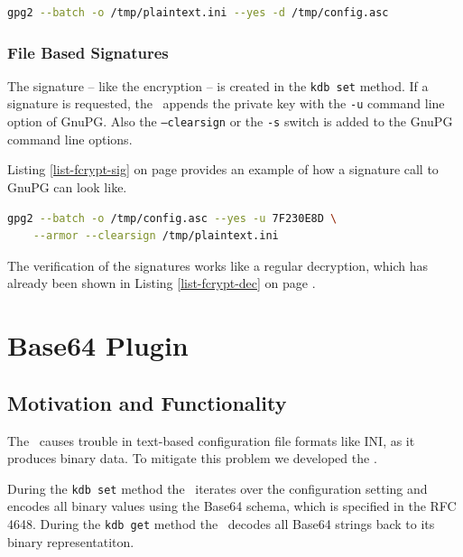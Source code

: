 \begin{lstlisting}[label=list-fcrypt-dec,language=Bash,caption={Fcrypt: decryption command}]
gpg2 --batch -o /tmp/plaintext.ini --yes -d /tmp/config.asc
\end{lstlisting}

\subsubsection{File Based Signatures}

The signature -- like the encryption -- is created in the \texttt{kdb set} method.
If a signature is requested, the \fcrypt ~appends the private key with the \texttt{-u} command line option of GnuPG.
Also the \texttt{---clearsign} or the \texttt{-s} switch is added to the GnuPG command line options.

Listing \ref{list-fcrypt-sig} on page \pageref{list-fcrypt-sig} provides an example of how a signature call to GnuPG can look like.

\begin{lstlisting}[label=list-fcrypt-sig,language=Bash,caption={Fcrypt: signature command}]
gpg2 --batch -o /tmp/config.asc --yes -u 7F230E8D \
	--armor --clearsign /tmp/plaintext.ini
\end{lstlisting}

The verification of the signatures works like a regular decryption, which has already been shown in Listing \ref{list-fcrypt-dec} on page \pageref{list-fcrypt-dec}.

\section{Base64 Plugin}
\label{base64-plugin}

\subsection{Motivation and Functionality}

The \crypto ~causes trouble in text-based configuration file formats like INI, as it produces binary data.
To mitigate this problem we developed the \base.

During the \texttt{kdb set} method the \base ~iterates over the configuration setting and encodes all binary values using the Base64 schema, which is specified in the RFC 4648.\cite{rfc4648}
During the \texttt{kdb get} method the \base ~decodes all Base64 strings back to its binary representatiton.


